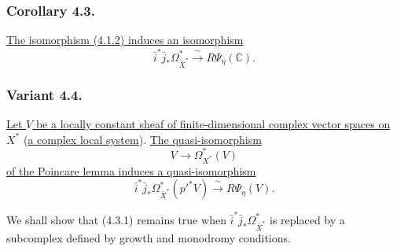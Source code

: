 \subsubsection*{Corollary 4.3.}
\underline{The isomorphism (4.1.2) induces an isomorphism}
\begin{equation}\tag{4.3.1}
\bar i^*\bar j_*\Omega_{\bar X^*}^*
\xrightarrow{\ \sim\ }R\Psi_\eta(\mathbb C).
\end{equation}

\subsubsection*{Variant 4.4.}
\underline{Let $V$ be a locally constant sheaf of finite-dimensional
complex vector spaces on $X^*$} (\underline{a complex local system}).  \underline{The
quasi-isomorphism}
\[
V\longrightarrow\Omega_{X^*}^*(V)
\]
\underline{of the Poincare lemma induces a quasi-isomorphism}
\begin{equation}\tag{4.4.1}
\bar i^*\bar j_*\Omega_{\bar X^*}^*(p'^*V)
\xrightarrow{\ \sim\ }R\Psi_\eta(V).
\end{equation}

We shall show that (4.3.1) remains true when
$\bar i^*\bar j_*\Omega_{\bar X^*}^*$ is replaced by a subcomplex
defined by growth and monodromy conditions.
